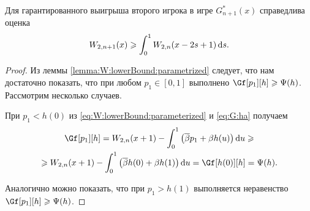 \begin{theorem}\label{theorem:W:bound}
  Для гарантированного выигрыша второго игрока в игре $G_{n+1}^*(x)$ справедлива
  оценка
  \begin{equation*}
    W_{2,n+1}(x) \geqslant \int_0^1 W_{2,n}(x - 2s + 1) \mathop{}\!\mathrm{d} s.
  \end{equation*}
\end{theorem}
\begin{proof}
  Из леммы \ref{lemma:W:lowerBound:parametrized} следует, что нам достаточно
  показать, что при любом $p_1 \in [0, 1]$ выполнено $\Gf[p_1][h] \geqslant
  \Psi(h)$. Рассмотрим несколько случаев.

  При $p_1 < h(0)$ из \eqref{eq:W:lowerBound:parameterized} и \eqref{eq:G:ha}
  получаем
  \begin{multline*}
    \Gf[p_1][h] =
    W_{2,n}(x + 1) - \int_0^1 \left( \DCo p_1 + \Co h(u) \right) \di u \geqslant \\
    \geqslant W_{2,n}(x + 1) - \int_0^1 \left( \DCo h(0) + \Co h(1) \right) \di
    u = \Gf[h(0)][h] = \Psi(h).
  \end{multline*}

  Аналогично можно показать, что при $p_1 > h(1)$ выполняется неравенство
  $\Gf[p_1][h] \geqslant \Psi(h)$.


\end{proof}
